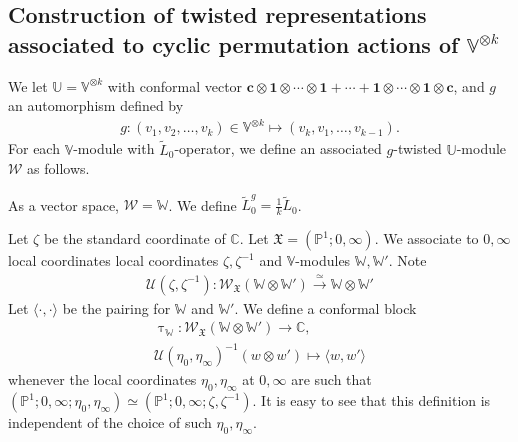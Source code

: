 \documentclass[12pt,a4paper,notitlepage]{article}
\theoremstyle{definition}
\theoremstyle{plain}
\newcommand{\fk}{\mathfrak}
\newcommand{\mc}{\mathcal}
\newcommand{\wtd}{\widetilde}
\newcommand{\id}{\mathbf{1}}
\newcommand{\bk}[1]{\langle {#1}\rangle}
\newcommand{\scr}{\mathscr}
\newcommand{\Vbb}{\mathbb V}
\newcommand{\Ubb}{\mathbb U}
\newcommand{\Wbb}{\mathbb W}
\newcommand{\Cbb}{\mathbb C}
\newcommand{\Pbb}{\mathbb P}
\newcommand{\cbf}{\mathbf c}
\numberwithin{equation}{section}
\begin{document}
\subsection*{Construction of twisted representations associated to cyclic permutation actions of $\Vbb^{\otimes k}$}

We let $\Ubb=\Vbb^{\otimes k}$ with conformal vector $\cbf\otimes\id\otimes\cdots\otimes\id+\cdots+\id\otimes\cdots\otimes\id\otimes\cbf$, and $g$ an automorphism defined by
\begin{align*}
g:(v_1,v_2,\dots,v_k)\in\Vbb^{\otimes k}\mapsto (v_k,v_1,\dots,v_{k-1}).	
\end{align*}
For each $\Vbb$-module with $\wtd L_0$-operator, we define an associated $g$-twisted $\Ubb$-module $\mc W$ as follows. 

As a vector space, $\mc W=\Wbb$. We define $\wtd L_0^g=\frac 1k\wtd L_0$.

Let $\zeta$ be the standard coordinate of $\Cbb$. Let $\fk X=(\Pbb^1;0,\infty)$. We associate to $0,\infty$ local coordinates local coordinates $\zeta,\zeta^{-1}$  and $\Vbb$-modules $\Wbb,\Wbb'$. Note
\begin{align*}
\mc U(\zeta,\zeta^{-1}):\scr W_{\fk X}(\Wbb\otimes\Wbb')\xrightarrow{\simeq}\Wbb\otimes\Wbb'	
\end{align*}
Let  $\bk{\cdot,\cdot}$ be  the pairing for $\Wbb$ and $\Wbb'$. We define a conformal block
\begin{gather*}
\uptau_\Wbb:\scr W_{\fk X}(\Wbb\otimes\Wbb')\rightarrow\Cbb,\\
\mc U(\eta_0,\eta_\infty)^{-1}(w\otimes w')\mapsto \bk{w,w'}
\end{gather*}
whenever the local coordinates $\eta_0,\eta_\infty$ at $0,\infty$ are such that $(\Pbb^1;0,\infty;\eta_0,\eta_\infty)\simeq(\Pbb^1;0,\infty;\zeta,\zeta^{-1})$. It is easy to see that this definition is independent of the choice of such $\eta_0,\eta_\infty$. 
\end{document}

